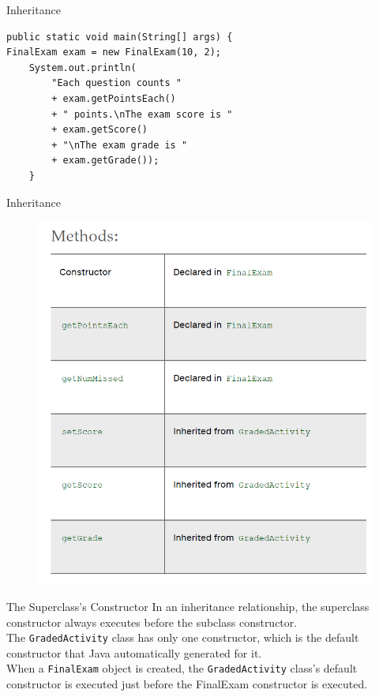 \documentclass[11pt]{beamer}
\begin{document}
\begin{frame}[fragile]{Inheritance}
    \begin{lstlisting}
public static void main(String[] args) {
FinalExam exam = new FinalExam(10, 2);
    System.out.println(
        "Each question counts " 
        + exam.getPointsEach()
        + " points.\nThe exam score is "
        + exam.getScore()
        + "\nThe exam grade is "
        + exam.getGrade());
    }
    \end{lstlisting}    
\end{frame}

\begin{frame}{Inheritance}
    \noindent 
    \begin{figure}[H]
    \centering
    \includegraphics[scale=0.4]{Images/chapter10_section01_listedFcns.png}
    \end{figure}
\end{frame}

\begin{frame}{The Superclass's Constructor}
    In an inheritance relationship, the superclass constructor always executes before the subclass constructor. \\ \vspace{1em}
    The \texttt{GradedActivity} class has only one constructor, which is the default constructor that Java automatically generated for it. \\ \vspace{1em} 
    When a \texttt{FinalExam} object is created, the \texttt{GradedActivity} class’s default constructor is executed just before the FinalExam constructor is executed.
\end{frame}
\end{document}

